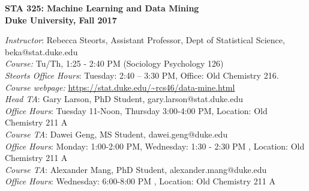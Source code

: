 \documentclass[11pt]{article}
\date{}
\begin{document}

\begin{center}
{\Large\bf STA 325: Machine Learning and Data Mining} \\

{\Large\bf Duke University, Fall 2017} \\
\end{center}



\emph{Instructor}: Rebecca Steorts,  Assistant Professor, Dept of Statistical Science, beka@stat.duke.edu\\
\emph{Course:} Tu/Th, 1:25 - 2:40 PM (Sociology Psychology 126)\\
\emph{Steorts Office Hours}: Tuesday: 2:40 -- 3:30 PM, Office: Old Chemistry 216.\\
\emph{Course webpage:} \url{https://stat.duke.edu/~rcs46/data-mine.html} \\

\emph{Head TA}: Gary Larson, PhD Student, gary.larson@stat.duke.edu\\
\emph{Office Hours}: Tuesday 11-Noon, Thursday 3:00-4:00 PM, Location: Old Chemistry 211 A \\

\emph{Course TA}: Dawei Geng, MS Student, dawei.geng@duke.edu\\
\emph{Office Hours}: Monday: 1:00-2:00 PM, Wednesday: 1:30 - 2:30 PM , Location: Old Chemistry 211 A\\

\emph{Course TA}: Alexander Mang, PhD Student, alexander.mang@duke.edu\\
\emph{Office Hours}: Wednesday: 6:00-8:00 PM , Location: Old Chemistry 211 A\\
\end{document}
